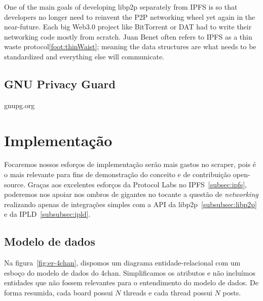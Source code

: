 One of the main goals of developing libp2p separately from IPFS is so that developers no longer need to reinvent the P2P networking wheel yet again in the near-future.
Each big Web3.0 project like BitTorrent or DAT had to write their networking code mostly from scratch.
Juan Benet often refers to IPFS as a thin waste protocol\ref{foot:thinWaist}; meaning the data structures are what needs to be standardized and everything else will communicate.

\subsection{GNU Privacy Guard}
gnupg.org

\section{Implementação}

Focaremos nossos esforços de implementação serão mais gastos no scraper, pois é o mais relevante para fins de demonstração do conceito e de contribuição open-source.
Graças aos excelentes esforços da Protocol Labs no IPFS~\ref{subsec:ipfs}, poderemos nos apoiar nos ombros de gigantes no tocante a questão de \textit{networking} realizando apenas de integrações simples com a API da libp2p~\ref{subsubsec:libp2p} e da IPLD~\ref{subsubsec:ipld}.

\subsection{Modelo de dados}

Na figura~\ref{fig:er-4chan}, dispomos um diagrama entidade-relacional com um esboço do modelo de dados do 4chan.
Simplificamos os atributos e não incluímos entidades que não fossem relevantes para o entendimento do modelo de dados.
De forma resumida, cada board possui $N$ threads e cada thread possui $N$ posts.

